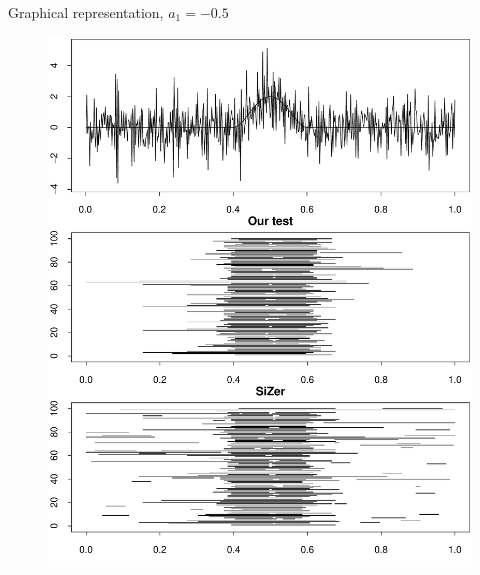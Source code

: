 \documentclass[10pt]{beamer}
\begin{document}
\begin{frame}{Graphical representation, $a_1 = -0.5$}
  \begin{figure}
    \centering
    \includegraphics[height=0.85\textheight]{min_int_with_T_500_a1_-50.pdf}
    \label{figure:comparison_results_2}
  \end{figure}
\end{frame}
\end{document}

